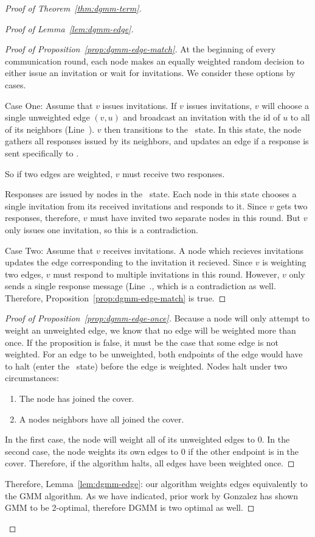 \begin{proof}[Proof of Theorem~\ref{thm:dgmm-term}]
\begin{proof}[Proof of Lemma~\ref{lem:dgmm-edge}]
\begin{proof}[Proof of Proposition~\ref{prop:dgmm-edge-match}]
At the beginning of every communication round, each node makes an equally weighted random decision to either issue an invitation or wait for invitations. We consider these options by cases.

    Case One: Assume that $v$ issues invitations. If $v$ issues invitations, $v$ will choose a single unweighted edge $(v,u)$ and broadcast an invitation with the id of $u$ to all of its neighbors (Line~). $v$ then transitions to the \cWd\ state. In this state, the node gathers all responses issued by its neighbors, and updates an edge if a response is sent specifically to .

    So if two edges are weighted, $v$ must receive two responses.

    Responses are issued by nodes in the \cRd\ state. Each node in this state chooses a single invitation from its received invitations and responds to it. Since $v$ gets two responses, therefore, $v$ must have invited two separate nodes in this round. But $v$ only issues one invitation, so this is a contradiction.

    Case Two: Assume that $v$ receives invitations. A node which recieves invitations updates the edge corresponding to the invitation it recieved. Since $v$ is weighting two edges, $v$ must respond to multiple invitations in this round. However, $v$ only sends a single response message (Line~., which is a contradiction as well.
    Therefore, Proposition~\ref{prop:dgmm-edge-match} is true.
  \end{proof}
  \begin{proof}[Proof of Proposition~\ref{prop:dgmm-edge-once}]
    Because a node will only attempt to weight an unweighted edge, we know that no edge will be weighted more than once. If the proposition is false, it must be the case that some edge is not weighted.
    For an edge to be unweighted, both endpoints of the edge would have to halt (enter the \cDd\ state) before the edge is weighted. Nodes halt under two circumstances:
    \begin{enumerate}
    \item The node has joined the cover.
    \item A nodes neighbors have all joined the cover.
    \end{enumerate}
    In the first case, the node will weight all of its unweighted edges to 0. In the second case, the node weights its own edges to 0 if the other endpoint is in the cover.
    Therefore, if the algorithm halts, all edges have been weighted once.
  \end{proof}
  Therefore, Lemma~\ref{lem:dgmm-edge}: our algorithm weights edges equivalently to the GMM algorithm. As we have indicated, prior work by Gonzalez has shown GMM to be 2-optimal, therefore DGMM is two optimal as well.
\end{proof}


\end{proof}
